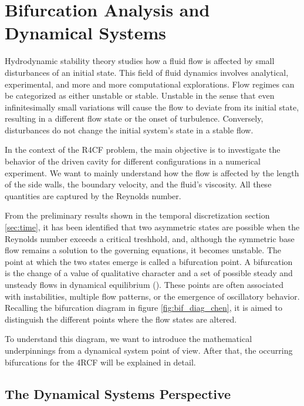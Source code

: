 
\section{Bifurcation Analysis and Dynamical Systems} \label{sec:bif}

Hydrodynamic stability theory studies how a fluid flow is affected by small
disturbances of an initial state. This field of fluid dynamics involves
analytical, experimental, and more and more computational explorations. Flow
regimes can be categorized as either unstable or stable. Unstable in the sense
that even infinitesimally small variations will cause the flow to deviate from
its initial state, resulting in a different flow state or the onset of
turbulence. Conversely, disturbances do not change the initial system's state
in a stable flow.

In the context of the R4CF problem, the main objective is to investigate the
behavior of the driven cavity for different configurations in a numerical
experiment. We want to mainly understand how the flow is affected by the length
of the side walls, the boundary velocity, and the fluid's viscosity. All these
quantities are captured by the Reynolds number.

From the preliminary results shown in the temporal discretization section
\ref{sec:time}, it has been identified that two asymmetric states are possible
when the Reynolds number exceeds a critical treshhold, and, although the
symmetric base flow remains a solution to the governing equations, it becomes
unstable. The point at which the two states emerge is called a bifurcation
point. A bifurcation is the change of a value of qualitative character and a
set of possible steady and unsteady flows in dynamical equilibrium
(\citeauthor{drazin2002}). These points are often associated with
instabilities, multiple flow patterns, or the emergence of oscillatory
behavior. Recalling the bifurcation diagram in figure \ref{fig:bif_diag_chen},
it is aimed to distinguish the different points where the flow states are
altered. 

To understand this diagram, we want to introduce the mathematical underpinnings
from a dynamical system point of view. After that, the occurring bifurcations
for the 4RCF will be explained in detail.

\subsection{The Dynamical Systems Perspective}


